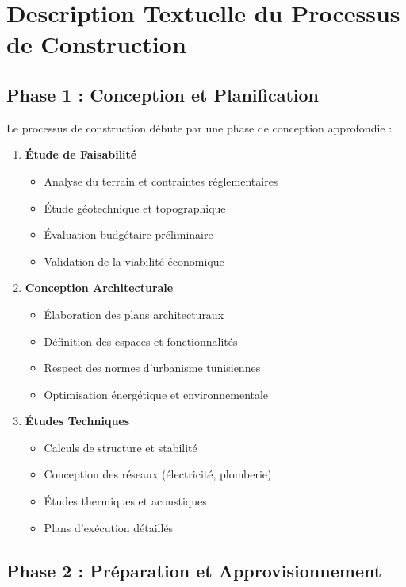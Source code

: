 \section{Description Textuelle du Processus de Construction}

\subsection{Phase 1 : Conception et Planification}

Le processus de construction débute par une phase de conception approfondie :

\begin{enumerate}
    \item \textbf{Étude de Faisabilité}
    \begin{itemize}
        \item Analyse du terrain et contraintes réglementaires
        \item Étude géotechnique et topographique
        \item Évaluation budgétaire préliminaire
        \item Validation de la viabilité économique
    \end{itemize}
    
    \item \textbf{Conception Architecturale}
    \begin{itemize}
        \item Élaboration des plans architecturaux
        \item Définition des espaces et fonctionnalités
        \item Respect des normes d'urbanisme tunisiennes
        \item Optimisation énergétique et environnementale
    \end{itemize}
    
    \item \textbf{Études Techniques}
    \begin{itemize}
        \item Calculs de structure et stabilité
        \item Conception des réseaux (électricité, plomberie)
        \item Études thermiques et acoustiques
        \item Plans d'exécution détaillés
    \end{itemize}
\end{enumerate}

\subsection{Phase 2 : Préparation et Approvisionnement}


